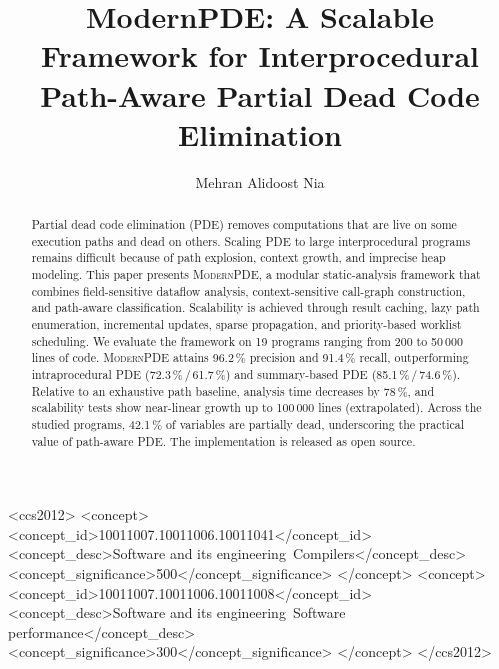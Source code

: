 \documentclass[acmsmall,screen,review,anonymous]{acmart}
\begin{document}
\title{ModernPDE: A Scalable Framework for Interprocedural Path-Aware Partial Dead Code Elimination}

\author{Mehran Alidoost Nia}





\renewcommand{\shortauthors}{}

\begin{abstract}
Partial dead code elimination (PDE) removes computations that are live on some execution paths and dead on others. Scaling PDE to large interprocedural programs remains difficult because of path explosion, context growth, and imprecise heap modeling. This paper presents \textsc{ModernPDE}, a modular static-analysis framework that combines field-sensitive dataflow analysis, context-sensitive call-graph construction, and path-aware classification. Scalability is achieved through result caching, lazy path enumeration, incremental updates, sparse propagation, and priority-based worklist scheduling. We evaluate the framework on 19 programs ranging from 200 to 50\,000 lines of code. \textsc{ModernPDE} attains 96.2\,\% precision and 91.4\,\% recall, outperforming intraprocedural PDE (72.3\,\%\,/\,61.7\,\%) and summary-based PDE (85.1\,\%\,/\,74.6\,\%). Relative to an exhaustive path baseline, analysis time decreases by 78\,\%, and scalability tests show near-linear growth up to 100\,000 lines (extrapolated). Across the studied programs, 42.1\,\% of variables are partially dead, underscoring the practical value of path-aware PDE. The implementation is released as open source.
\end{abstract}

\begin{CCSXML}
<ccs2012>
   <concept>
       <concept_id>10011007.10011006.10011041</concept_id>
       <concept_desc>Software and its engineering~Compilers</concept_desc>
       <concept_significance>500</concept_significance>
       </concept>
   <concept>
       <concept_id>10011007.10011006.10011008</concept_id>
       <concept_desc>Software and its engineering~Software performance</concept_desc>
       <concept_significance>300</concept_significance>
       </concept>
 </ccs2012>
\end{CCSXML}
\end{document}
